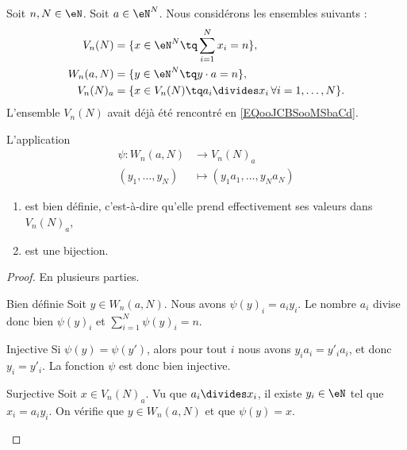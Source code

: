 Soit \( n,N\in \eN\). Soit \( a\in \eN^N\). Nous considérons les ensembles suivants :
\begin{subequations}
    \begin{align}
    V_n(N)&=\{ x\in \eN^N\tq \sum_{i=1}^Nx_i=n \}, \\
    W_n(a,N)&=\{ y\in \eN^N\tq y\cdot a=n \},\\
    V_n(N)_a&=\{ x\in V_n(N)\tq a_i\divides x_i\,\forall i=1,\ldots, N \}.
    \end{align}
\end{subequations}
L'ensemble \( V_n(N)\) avait déjà été rencontré en \eqref{EQooJCBSooMSbaCd}.

\begin{lemma}       \label{LEMooLKCAooCeDnSj}
    L'application
    \begin{equation}
        \begin{aligned}
            \psi\colon W_n(a,N)&\to V_n(N)_a \\
            (y_1,\ldots, y_N)&\mapsto (y_1a_1,\ldots, y_Na_N) 
        \end{aligned}
    \end{equation}
    \begin{enumerate}
        \item       
            est bien définie, c'est-à-dire qu'elle prend effectivement ses valeurs dans \( V_n(N)_a\),
        \item
            est une bijection.
    \end{enumerate}
\end{lemma}

\begin{proof}
    En plusieurs parties.
    \begin{subproof}
        \item[Bien définie]
            Soit \( y\in W_n(a,N)\). Nous avons \( \psi(y)_i=a_iy_i\). Le nombre \( a_i\) divise donc bien \( \psi(y)_i\) et \( \sum_{i=1}^N\psi(y)_i=n\).
        \item[Injective]
            Si \( \psi(y)=\psi(y')\), alors pour tout \( i\) nous avons \( y_ia_i=y'_ia_i\), et donc \( y_i=y'_i\). La fonction \( \psi\) est donc bien injective.
        \item[Surjective]
            Soit \( x\in V_n(N)_a\). Vu que \( a_i\divides x_i\), il existe \( y_i\in \eN\) tel que \( x_i=a_iy_i\). On vérifie que \( y\in W_n(a,N)\) et que \( \psi(y)=x\).
    \end{subproof}
\end{proof}


